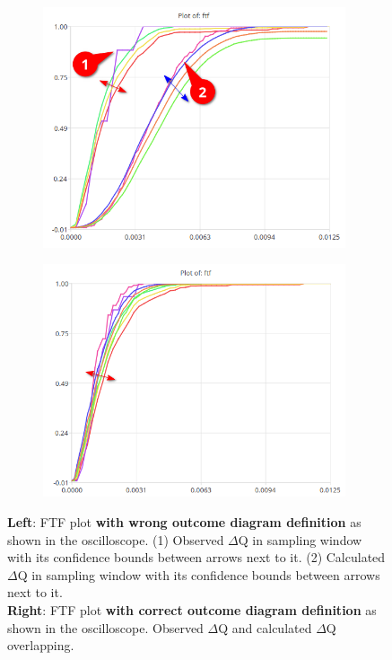         \begin{figure}[H]
                \centering
                \begin{subfigure}{.5\textwidth}
                    \centering
                    \includegraphics[width =0.98\textwidth]{img/bad1.png}
                    \label{fig:bad}
                \end{subfigure}%
                \begin{subfigure}{.5\textwidth}%
                    \centering%
                    \includegraphics[width =0.98\textwidth]{img/gooda.png}%
                    \label{fig:good}%
                \end{subfigure}%
                \caption{\textbf{Left}: FTF plot \textbf{with wrong outcome diagram definition} as shown in the oscilloscope. (1) Observed $\Delta$Q in sampling window with its confidence bounds between arrows next to it. (2) Calculated $\Delta$Q in sampling window with its confidence bounds between arrows next to it. \\
                \textbf{Right}: FTF plot \textbf{with correct outcome diagram definition} as shown in the oscilloscope. Observed $\Delta$Q and calculated $\Delta$Q overlapping.}
                \label{fig:ftf_osc}%
            \end{figure}%

